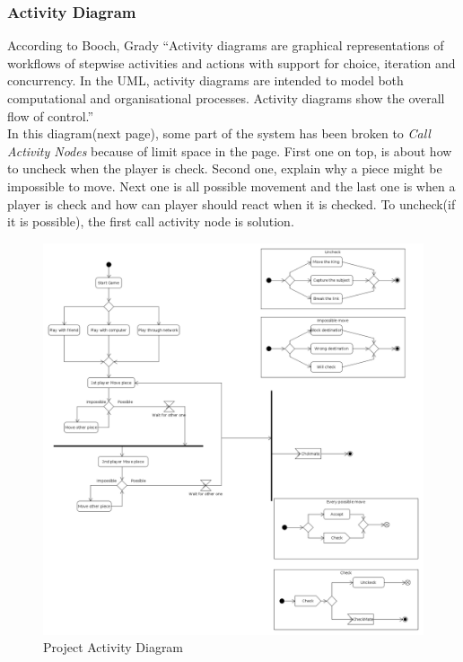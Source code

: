 \documentclass[a4paper,10pt]{article}
\begin{document}
\subsubsection{Activity Diagram}
According to Booch, Grady ``Activity diagrams are graphical representations of workflows of stepwise activities and actions with support for choice, iteration and concurrency. In the UML, activity diagrams are intended to model both computational and organisational processes. Activity diagrams show the overall flow of control.''\cite{booch1999uml}\\
In this diagram(next page), some part of the system has been broken to \textit{Call Activity Nodes} because of limit space in the page. First one on top, is about how to uncheck when the player is check. Second one, explain why a piece might be impossible to move. Next one is all possible movement and the last one is when a player is check and how can player should react when it is checked. To uncheck(if it is possible), the first call activity node is solution.
\clearpage
\pagebreak
\begin{figure}
  \centering
	\includegraphics[width=\textwidth]{activitydiagram}
  \caption{Project Activity Diagram  \label{fig:activitydiagram}}
\end{figure}
\clearpage
\pagebreak
\end{document}
